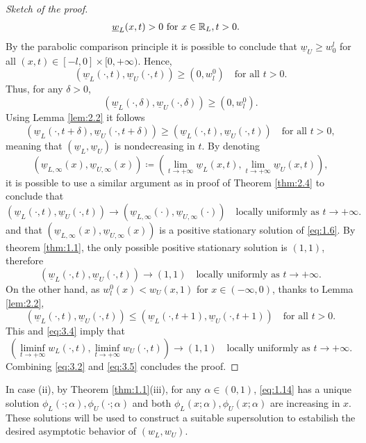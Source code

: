 \begin{proof}[Sketch of the proof]
\begin{align*}
        \underline{w}_L(x, t) > 0 & \text{ for } x \in \mathbb{R}_L, t > 0.
    \end{align*}
    By the parabolic comparison principle it is possible to conclude that \(\underline{w}_U \geq w_0^l\) for all \((x,t) \in [-l, 0] \times [0, +\infty)\). Hence,
    \begin{equation*}
        (\underline{w}_L(\cdot, t), \underline{w}_U(\cdot, t)) \geq (0, w_l^0) \quad \text{for all } t > 0.
    \end{equation*}
    Thus, for any \(\delta > 0\), 
    \begin{equation*}
        (\underline{w}_L(\cdot, \delta), \underline{w}_U(\cdot, \delta)) \geq (0, w_l^0).
    \end{equation*}
    Using Lemma \ref{lem:2.2} it follows
    \begin{equation*}
        (\underline{w}_L(\cdot, t + \delta), \underline{w}_U(\cdot, t + \delta)) \geq (\underline{w}_L(\cdot, t), \underline{w}_U(\cdot, t)) \quad \text{for all } t > 0,
    \end{equation*}
    meaning that \((\underline{w}_L, \underline{w}_U)\) is nondecreasing in \(t\). 
    By denoting 
    \[
        (\underline{w}_{L, \infty}(x), \underline{w}_{U, \infty}(x)) \coloneqq (\lim_{t \to +\infty} \underline{w}_L(x, t), \lim_{t \to +\infty} \underline{w}_U(x, t)), 
    \]
    it is possible to use a similar argument as in proof of Theorem \ref{thm:2.4} to conclude that
    \[
        (\underline{w}_{L}(\cdot, t), \underline{w}_{U}(\cdot, t)) \to (\underline{w}_{L, \infty}(\cdot), \underline{w}_{U, \infty}(\cdot)) \quad \text{locally uniformly as } t \to +\infty.
    \]
    and that \((\underline{w}_{L, \infty}(x), \underline{w}_{U, \infty}(x))\) is a positive stationary solution of \eqref{eq:1.6}. By theorem \ref{thm:1.1}, the only possible positive stationary solution is \((1, 1)\), therefore
    \begin{equation}
        (\underline{w}_{L}(\cdot, t), \underline{w}_{U}(\cdot, t)) \to (1, 1) \quad \text{locally uniformly as } t \to +\infty.
        \label{eq:3.4}
    \end{equation}
    On the other hand, as \(w_l^0(x) < w_U(x, 1)\) for \(x \in (-\infty, 0)\), thanks to Lemma \ref{lem:2.2},
    \[
        (\underline{w}_L(\cdot, t), \underline{w}_U(\cdot, t)) \leq (\underline{w}_L(\cdot, t + 1), \underline{w}_U(\cdot, t + 1)) \quad \text{for all } t > 0.
    \]
    This and \eqref{eq:3.4} imply that
    \begin{equation}
        (\liminf_{t \to +\infty} w_L(\cdot, t), \liminf_{t \to +\infty} w_U(\cdot, t)) \to (1, 1) \quad \text{locally uniformly as } t \to +\infty.
        \label{eq:3.5}
    \end{equation}
    Combining \eqref{eq:3.2} and \eqref{eq:3.5} concludes the proof.
\end{proof}
In case (ii), by Theorem \ref{thm:1.1}(iii), for any \(\alpha \in (0, 1)\), \eqref{eq:1.14} has a unique solution \(\phi_L(\cdot; \alpha), \phi_U(\cdot; \alpha)\) and both \(\phi_L(x; \alpha), \phi_U(x; \alpha)\) are increasing in \(x\). These solutions will be used to construct a suitable supersolution to estabilish the desired asymptotic behavior of \((w_L, w_U)\). 

